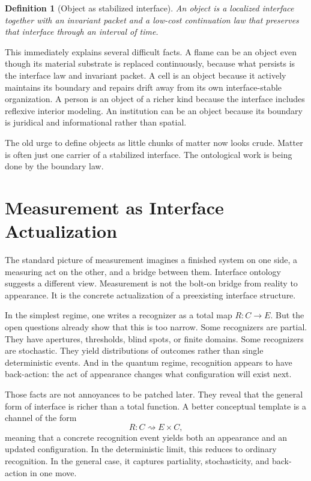 \documentclass[11pt]{article}
\newtheorem{definition}{Definition}
\begin{document}
\begin{definition}[Object as stabilized interface]
An object is a localized interface together with an invariant packet and a low-cost continuation law that preserves that interface through an interval of time.
\end{definition}

This immediately explains several difficult facts.
A flame can be an object even though its material substrate is replaced continuously, because what persists is the interface law and invariant packet.
A cell is an object because it actively maintains its boundary and repairs drift away from its own interface-stable organization.
A person is an object of a richer kind because the interface includes reflexive interior modeling.
An institution can be an object because its boundary is juridical and informational rather than spatial.

The old urge to define objects as little chunks of matter now looks crude.
Matter is often just one carrier of a stabilized interface.
The ontological work is being done by the boundary law.

\section{Measurement as Interface Actualization}

The standard picture of measurement imagines a finished system on one side, a measuring act on the other, and a bridge between them.
Interface ontology suggests a different view.
Measurement is not the bolt-on bridge from reality to appearance.
It is the concrete actualization of a preexisting interface structure.

In the simplest regime, one writes a recognizer as a total map $R : C \to E$.
But the open questions already show that this is too narrow.
Some recognizers are partial.
They have apertures, thresholds, blind spots, or finite domains.
Some recognizers are stochastic.
They yield distributions of outcomes rather than single deterministic events.
And in the quantum regime, recognition appears to have back-action: the act of appearance changes what configuration will exist next.

Those facts are not annoyances to be patched later.
They reveal that the general form of interface is richer than a total function.
A better conceptual template is a channel of the form
\[
R : C \rightsquigarrow E \times C,
\]
meaning that a concrete recognition event yields both an appearance and an updated configuration.
In the deterministic limit, this reduces to ordinary recognition.
In the general case, it captures partiality, stochasticity, and back-action in one move.
\end{document}
